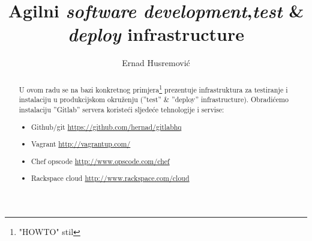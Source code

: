 \documentclass[times, utf8, seminar]{fit}
\begin{document}


\title{Agilni \emph{software development},\newline \emph{test} \& \emph{deploy} infrastructure}

\author{Ernad Husremović}


\maketitle

\tableofcontents

\newpage

\begin{abstract}

U ovom radu se na bazi konkretnog primjera\footnote{"HOWTO" stil} prezentuje infrastruktura za testiranje i instalaciju u produkcijskom okruženju (''test'' \& ''deploy'' infrastructure). Obradićemo instalaciju ''Gitlab'' servera koristeći sljedeće tehnologije i servise:
\begin{itemize}
  \item Github/git \url{https://github.com/hernad/gitlabhq}
  \item Vagrant  \url{http://vagrantup.com/}
  \item Chef opscode \url{http://www.opscode.com/chef}
  \item Rackspace cloud \url{http://www.rackspace.com/cloud}
\end{itemize}

\end{abstract}

\end{document}
